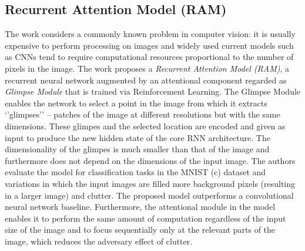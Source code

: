 \documentclass[English]{style/ic-tese-v3}
\begin{document}
\subsection{Recurrent Attention Model (RAM)}
The work \cite{ref:rec-models} considers a commonly known problem in computer vision: it is usually
expensive to perform processing on images and widely used current models such as
CNNs tend to require computational resources proportional to the number of pixels in the image.
The work proposes a \emph{Recurrent Attention Model (RAM)}, a recurrent neural network augmented by
an attentional component regarded as \emph{Glimpse Module} that is trained via Reinforcement Learning.
The Glimpse Module enables the network to select a point in the image from which it extracts `'glimpses''
-- patches of the image at different resolutions but with the same dimensions.
These glimpes and the selected location are encoded and given as input to produce
the new hidden state of the core RNN architecture.
The dimensionality of the glimpes is much smaller than that of the image and furthermore does not depend
on the dimensions of the input image.
The authors evaluate the model for classification tasks in the MNIST (c) dataset and variations in which the
input images are filled more background pixels (resulting in a larger image) and clutter.
The proposed model outperforms a convolutional neural network baseline.
Furthermore, the attentional module in the model enables it to perform the same amount of computation
regardless of the input size of the image and to focus sequentially only at the relevant parts of the image,
which reduces the adversary effect of clutter.
\end{document}
